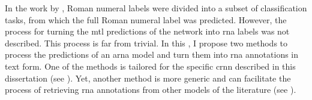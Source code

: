 
In the work by \textcite{chen2018functional}, Roman numeral
labels were divided into a subset of classification tasks,
from which the full Roman numeral label was predicted.
However, the process for turning the \gls{mtl} predictions
of the network into \gls{rna} labels was not described. This
process is far from trivial. In this \thesisdiss{}, I
propose two methods to process the predictions of an
\gls{arna} model and turn them into \gls{rna} annotations in
text form. One of the methods is tailored for the specific
\gls{crnn} described in this dissertation (see
). Yet, another method is more
generic and can facilitate the process of retrieving
\gls{rna} annotations from other models of the literature
(see ).
